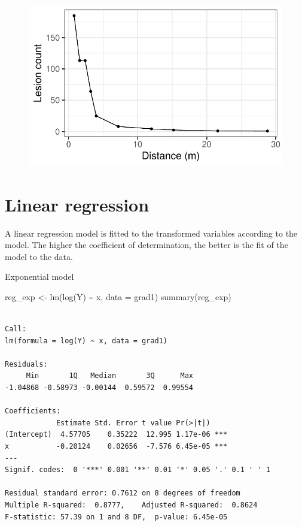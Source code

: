 \documentclass[
  letterpaper,
  DIV=11,
  numbers=noendperiod]{scrreprt}
\newenvironment{Shaded}{\begin{snugshade}}{\end{snugshade}}
\newcommand{\AttributeTok}[1]{\textcolor[rgb]{0.40,0.45,0.13}{#1}}
\newcommand{\FunctionTok}[1]{\textcolor[rgb]{0.28,0.35,0.67}{#1}}
\newcommand{\NormalTok}[1]{\textcolor[rgb]{0.00,0.23,0.31}{#1}}
\newcommand{\OtherTok}[1]{\textcolor[rgb]{0.00,0.23,0.31}{#1}}
\newcommand{\SpecialCharTok}[1]{\textcolor[rgb]{0.37,0.37,0.37}{#1}}
\begin{document}
\begin{figure}[H]

{\centering \includegraphics{./spatial-fitting_files/figure-pdf/unnamed-chunk-6-1.pdf}

}

\end{figure}

\hypertarget{linear-regression-1}{%
\chapter{Linear regression}\label{linear-regression-1}}

A linear regression model is fitted to the transformed variables
according to the model. The higher the coefficient of determination, the
better is the fit of the model to the data.

Exponential model

\begin{Shaded}
\begin{Highlighting}[]
\NormalTok{reg\_exp }\OtherTok{\textless{}{-}} \FunctionTok{lm}\NormalTok{(}\FunctionTok{log}\NormalTok{(Y) }\SpecialCharTok{\textasciitilde{}}\NormalTok{ x, }\AttributeTok{data =}\NormalTok{ grad1)}
\FunctionTok{summary}\NormalTok{(reg\_exp)}
\end{Highlighting}
\end{Shaded}

\begin{verbatim}

Call:
lm(formula = log(Y) ~ x, data = grad1)

Residuals:
     Min       1Q   Median       3Q      Max 
-1.04868 -0.58973 -0.00144  0.59572  0.99554 

Coefficients:
            Estimate Std. Error t value Pr(>|t|)    
(Intercept)  4.57705    0.35222  12.995 1.17e-06 ***
x           -0.20124    0.02656  -7.576 6.45e-05 ***
---
Signif. codes:  0 '***' 0.001 '**' 0.01 '*' 0.05 '.' 0.1 ' ' 1

Residual standard error: 0.7612 on 8 degrees of freedom
Multiple R-squared:  0.8777,    Adjusted R-squared:  0.8624 
F-statistic: 57.39 on 1 and 8 DF,  p-value: 6.45e-05
\end{verbatim}
\end{document}
